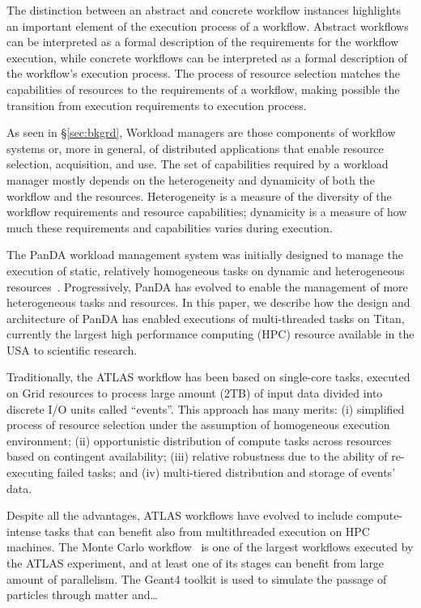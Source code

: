 The distinction between an abstract and concrete workflow instances highlights
an important element of the execution process of a workflow. Abstract workflows
can be interpreted as a formal description of the requirements for the workflow
execution, while concrete workflows can be interpreted as a formal description
of the workflow's execution process. The process of resource selection matches
the capabilities of resources to the requirements of a workflow, making possible
the transition from execution requirements to execution process.

As seen in \S\ref{sec:bkgrd}, Workload managers are those components of workflow
systems or, more in general, of distributed applications that enable resource
selection, acquisition, and use. The set of capabilities required by a workload
manager mostly depends on the heterogeneity and dynamicity of both the workflow
and the resources. Heterogeneity is a measure of the diversity of the workflow
requirements and resource capabilities; dynamicity is a measure of how much
these requirements and capabilities varies during execution.

The PanDA workload management system was initially designed to manage the
execution of static, relatively homogeneous tasks on dynamic and heterogeneous
resources~\cite{panda_grid}. Progressively, PanDA has evolved to enable the
management of more heterogeneous tasks and resources. In this paper, we describe
how the design and architecture of PanDA has enabled executions of
multi-threaded tasks on Titan, currently the largest high performance computing
(HPC) resource available in the USA to scientific research.

Traditionally, the ATLAS workflow has been based on single-core tasks, executed
on Grid resources to process large amount (2TB) of input data divided into
discrete I/O units called ``events''. This approach has many merits: (i)
simplified process of resource selection under the assumption of homogeneous
execution environment; (ii) opportunistic distribution of compute tasks across
resources based on contingent availability; (iii) relative robustness due to the
ability of re-executing failed tasks; and (iv) multi-tiered distribution and
storage of events' data.

Despite all the advantages, ATLAS workflows have evolved to include
compute-intense tasks that can benefit also from multithreaded execution on HPC
machines. The Monte Carlo workflow~\cite{} is one of the largest workflows
executed by the ATLAS experiment, and at least one of its stages can benefit
from large amount of parallelism. The Geant4 toolkit is used to simulate the
passage of particles through matter and\ldots

